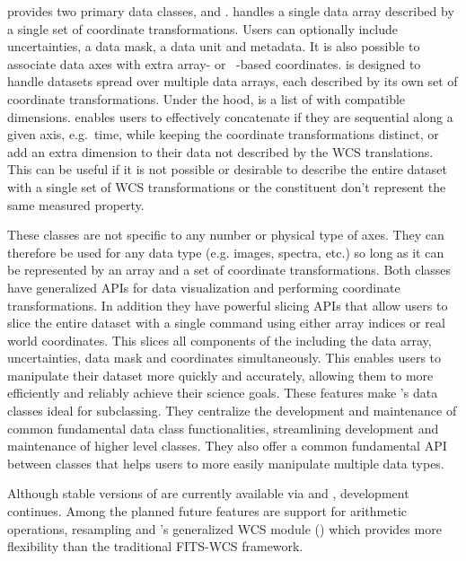  provides two primary data classes,  and .
 handles a single data array described by a single set of coordinate transformations.
Users can optionally include uncertainties, a data mask, a data unit and metadata.
It is also possible to associate data axes with extra array- or \astropy\ -based coordinates.
 is designed to handle datasets spread over multiple data arrays, each described by its own set of coordinate transformations.
Under the hood,  is a list of  with compatible dimensions.
 enables users to effectively concatenate  if they are sequential along a given axis, e.g.\ time, while keeping the coordinate transformations distinct, or add an extra dimension to their data not described by the WCS translations.
This can be useful if it is not possible or desirable to describe the entire dataset with a single set of WCS transformations or the constituent  don't represent the same measured property.

These classes are not specific to any number or physical type of axes.
They can therefore be used for any data type (e.g. images, spectra, etc.) so long as it can be represented by an array and a set of coordinate transformations.
Both classes have generalized APIs for data visualization and performing coordinate transformations.
In addition they have powerful slicing APIs that allow users to slice the entire dataset with a single command using either array indices or real world coordinates.
This slices all components of the  including the data array, uncertainties, data mask and coordinates simultaneously.
This enables users to manipulate their dataset more quickly and accurately, allowing them to more efficiently and reliably achieve their science goals.
These features make 's data classes ideal for subclassing.  They centralize the development and maintenance of common fundamental data class functionalities, streamlining development and maintenance of higher level classes.  They also offer a common fundamental API between classes that helps users to more easily manipulate multiple data types.

Although stable versions of  are currently available via  and , development continues.
Among the planned future features are support for arithmetic operations, resampling and \astropy's generalized WCS module () which provides more flexibility than the traditional FITS-WCS framework.


